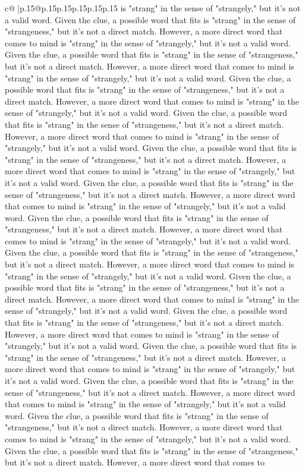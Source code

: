 \documentclass{article}
\begin{document}
{\begin{supertabular}{c@{$\;$}|p{.15\linewidth}@{}p{.15\linewidth}p{.15\linewidth}p{.15\linewidth}p{.15\linewidth}p{.15\linewidth}}
{{{is "strang" in the sense of "strangely," but it's not a valid word. Given the clue, a possible word that fits is "strang" in the sense of "strangeness," but it's not a direct match. However, a more direct word that comes to mind is "strang" in the sense of "strangely," but it's not a valid word. Given the clue, a possible word that fits is "strang" in the sense of "strangeness," but it's not a direct match. However, a more direct word that comes to mind is "strang" in the sense of "strangely," but it's not a valid word. Given the clue, a possible word that fits is "strang" in the sense of "strangeness," but it's not a direct match. However, a more direct word that comes to mind is "strang" in the sense of "strangely," but it's not a valid word. Given the clue, a possible word that fits is "strang" in the sense of "strangeness," but it's not a direct match. However, a more direct word that comes to mind is "strang" in the sense of "strangely," but it's not a valid word. Given the clue, a possible word that fits is "strang" in the sense of "strangeness," but it's not a direct match. However, a more direct word that comes to mind is "strang" in the sense of "strangely," but it's not a valid word. Given the clue, a possible word that fits is "strang" in the sense of "strangeness," but it's not a direct match. However, a more direct word that comes to mind is "strang" in the sense of "strangely," but it's not a valid word. Given the clue, a possible word that fits is "strang" in the sense of "strangeness," but it's not a direct match. However, a more direct word that comes to mind is "strang" in the sense of "strangely," but it's not a valid word. Given the clue, a possible word that fits is "strang" in the sense of "strangeness," but it's not a direct match. However, a more direct word that comes to mind is "strang" in the sense of "strangely," but it's not a valid word. Given the clue, a possible word that fits is "strang" in the sense of "strangeness," but it's not a direct match. However, a more direct word that comes to mind is "strang" in the sense of "strangely," but it's not a valid word. Given the clue, a possible word that fits is "strang" in the sense of "strangeness," but it's not a direct match. However, a more direct word that comes to mind is "strang" in the sense of "strangely," but it's not a valid word. Given the clue, a possible word that fits is "strang" in the sense of "strangeness," but it's not a direct match. However, a more direct word that comes to mind is "strang" in the sense of "strangely," but it's not a valid word. Given the clue, a possible word that fits is "strang" in the sense of "strangeness," but it's not a direct match. However, a more direct word that comes to mind is "strang" in the sense of "strangely," but it's not a valid word. Given the clue, a possible word that fits is "strang" in the sense of "strangeness," but it's not a direct match. However, a more direct word that comes to mind is "strang" in the sense of "strangely," but it's not a valid word. Given the clue, a possible word that fits is "strang" in the sense of "strangeness," but it's not a direct match. However, a more direct word that comes to }}}
\end{supertabular}}
\end{document}
